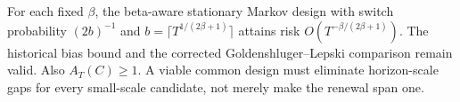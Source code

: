 For each fixed \(\beta\), the beta-aware stationary Markov design with switch probability \((2b)^{-1}\) and \(b=\lceil T^{1/(2\beta+1)}\rceil\) attains risk \(O(T^{-\beta/(2\beta+1)})\). The historical bias bound and the corrected Goldenshluger--Lepski comparison remain valid. Also \(A_T(C)\ge1\). A viable common design must eliminate horizon-scale gaps for every small-scale candidate, not merely make the renewal span one.